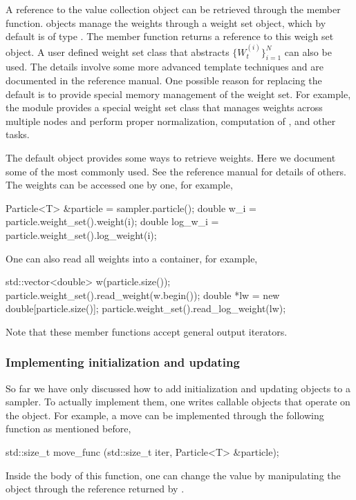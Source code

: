 A reference to the value collection  object can be retrieved through
the  member function.  objects
manage the weights through a weight set object, which by default is of type
. The  member function returns a
reference to this weigh set object. A user defined weight set class that
abstracts $\{W_t^{(i)}\}_{i=1}^N$ can also be used. The details involve some
more advanced \cpp template techniques and are documented in the reference
manual. One possible reason for replacing the default is to provide special
memory management of the weight set. For example, the \mpi module provides a
special weight set class that manages weights across multiple nodes and
perform proper normalization, computation of \ess, and other tasks.

The default  object provides some ways to retrieve weights.
Here we document some of the most commonly used. See the reference manual for
details of others. The weights can be accessed one by one, for example,
\begin{cppcode}
Particle<T> &particle = sampler.particle();
double w_i     = particle.weight_set().weight(i);
double log_w_i = particle.weight_set().log_weight(i);
\end{cppcode}
One can also read all weights into a container, for example,
\begin{cppcode}
std::vector<double> w(particle.size());
particle.weight_set().read_weight(w.begin());
double *lw = new double[particle.size()];
particle.weight_set().read_log_weight(lw);
\end{cppcode}
Note that these member functions accept general output iterators.

\subsubsection{Implementing initialization and updating}

So far we have only discussed how to add initialization and updating objects
to a sampler. To actually implement them, one writes callable objects that
operate on the  object. For example, a move can be
implemented through the following function as mentioned before,
\begin{cppcode}
std::size_t move_func (std::size_t iter, Particle<T> &particle);
\end{cppcode}
Inside the body of this function, one can change the value by manipulating the
object through the reference returned by .

